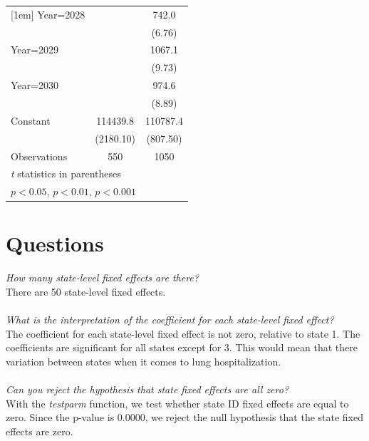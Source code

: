 \documentclass{article}
\begin{document}
{\begin{longtable}{l*{2}{c}}
[1em]
Year=2028           &                     &       742.0\sym{***}\\
                    &                     &      (6.76)         \\
[1em]
Year=2029           &                     &      1067.1\sym{***}\\
                    &                     &      (9.73)         \\
[1em]
Year=2030           &                     &       974.6\sym{***}\\
                    &                     &      (8.89)         \\
[1em]
Constant            &    114439.8\sym{***}&    110787.4\sym{***}\\
                    &   (2180.10)         &    (807.50)         \\
\hline
Observations        &         550         &        1050         \\
\hline\hline
\multicolumn{3}{l}{\footnotesize \textit{t} statistics in parentheses}\\
\multicolumn{3}{l}{\footnotesize \sym{*} \(p<0.05\), \sym{**} \(p<0.01\), \sym{***} \(p<0.001\)}\\
\end{longtable}
}

\newpage
\section{Questions}

\textit{How many state-level fixed effects are there?} \\

There are 50 state-level fixed effects.\\
\\
\textit{What is the interpretation of the coefficient for each state-level fixed effect?} \\

The coefficient for each state-level fixed effect is not zero, relative to state 1. The coefficients are significant for all states except for 3. This would mean that there variation between states when it comes to lung hospitalization.\\
\\
\textit{Can you reject the hypothesis that state fixed effects are all zero?} \\

With the \textit{testparm} function, we test whether state ID fixed effects are equal to zero. Since the p-value is 0.0000, we reject the null hypothesis that the state fixed effects are zero.
\end{document}

